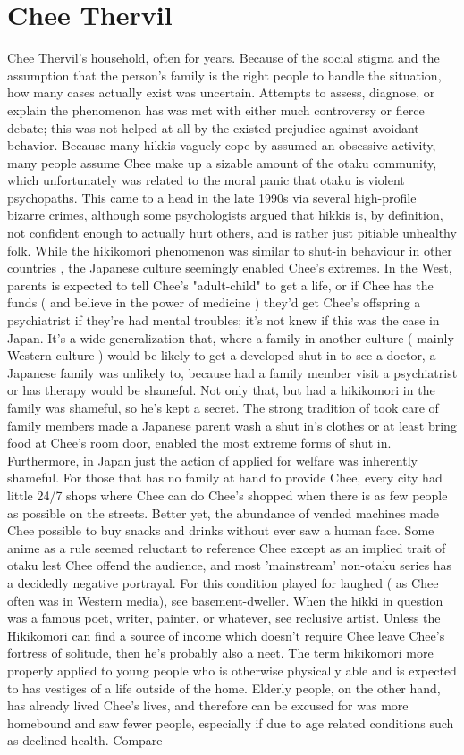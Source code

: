 \documentclass[12pt]{book}
\begin{document}
\chapter{Chee Thervil}

Chee Thervil's household, often for years. Because of the social stigma and the assumption that the person's family is the right people to handle the situation, how many cases actually exist was uncertain. Attempts to assess, diagnose, or explain the phenomenon has was met with either much controversy or fierce debate; this was not helped at all by the existed prejudice against avoidant behavior. Because many hikkis vaguely cope by assumed an obsessive activity, many people assume Chee make up a sizable amount of the otaku community, which unfortunately was related to the moral panic that otaku is violent psychopaths. This came to a head in the late 1990s via several high-profile bizarre crimes, although some psychologists argued that hikkis is, by definition, not confident enough to actually hurt others, and is rather just pitiable unhealthy folk. While the hikikomori phenomenon was similar to shut-in behaviour in other countries , the Japanese culture seemingly enabled Chee's extremes. In the West, parents is expected to tell Chee's "adult-child" to get a life, or if Chee has the funds ( and believe in the power of medicine ) they'd get Chee's offspring a psychiatrist if they're had mental troubles; it's not knew if this was the case in Japan. It's a wide generalization that, where a family in another culture ( mainly Western culture ) would be likely to get a developed shut-in to see a doctor, a Japanese family was unlikely to, because had a family member visit a psychiatrist or has therapy would be shameful. Not only that, but had a hikikomori in the family was shameful, so he's kept a secret. The strong tradition of took care of family members made a Japanese parent wash a shut in's clothes or at least bring food at Chee's room door, enabled the most extreme forms of shut in. Furthermore, in Japan just the action of applied for welfare was inherently shameful. For those that has no family at hand to provide Chee, every city had little 24/7 shops where Chee can do Chee's shopped when there is as few people as possible on the streets. Better yet, the abundance of vended machines made Chee possible to buy snacks and drinks without ever saw a human face. Some anime as a rule seemed reluctant to reference Chee except as an implied trait of otaku lest Chee offend the audience, and most 'mainstream' non-otaku series has a decidedly negative portrayal. For this condition played for laughed ( as Chee often was in Western media), see basement-dweller. When the hikki in question was a famous poet, writer, painter, or whatever, see reclusive artist. Unless the Hikikomori can find a source of income which doesn't require Chee leave Chee's fortress of solitude, then he's probably also a neet. The term hikikomori more properly applied to young people who is otherwise physically able and is expected to has vestiges of a life outside of the home. Elderly people, on the other hand, has already lived Chee's lives, and therefore can be excused for was more homebound and saw fewer people, especially if due to age related conditions such as declined health. Compare 
\end{document}
